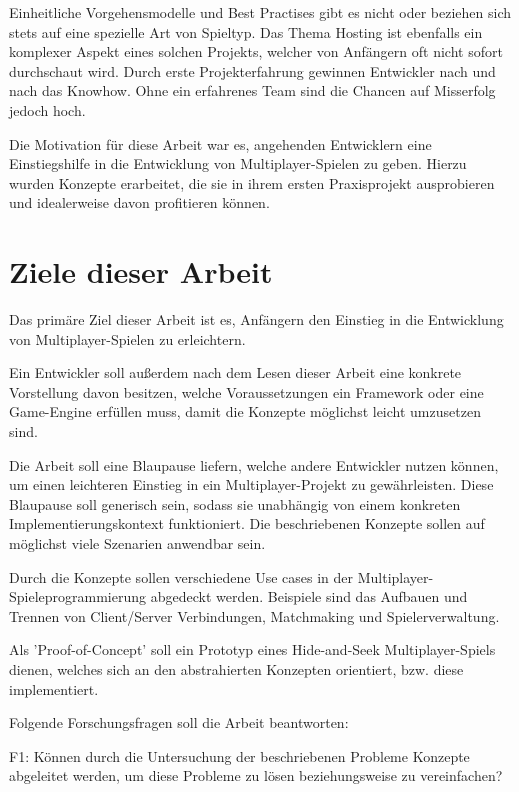 Einheitliche Vorgehensmodelle und Best Practises gibt es nicht oder beziehen sich stets auf eine spezielle Art von Spieltyp. Das Thema Hosting ist ebenfalls ein komplexer Aspekt eines solchen Projekts, welcher von Anfängern oft nicht sofort durchschaut wird. Durch erste Projekterfahrung gewinnen Entwickler nach und nach das Knowhow. Ohne ein erfahrenes Team sind die Chancen auf Misserfolg jedoch hoch. \cite{Payne.18.09.2019}

Die Motivation für diese Arbeit war es, angehenden Entwicklern eine Einstiegshilfe in die Entwicklung von Multiplayer-Spielen zu geben. Hierzu wurden Konzepte erarbeitet, die sie in ihrem ersten Praxisprojekt ausprobieren und idealerweise davon profitieren können.

\section{Ziele dieser Arbeit}

Das primäre Ziel dieser Arbeit ist es, Anfängern den Einstieg in die Entwicklung von Multiplayer-Spielen zu erleichtern.

Ein Entwickler soll außerdem nach dem Lesen dieser Arbeit eine konkrete Vorstellung davon besitzen, welche Voraussetzungen ein Framework oder eine Game-Engine erfüllen muss, damit die Konzepte möglichst leicht umzusetzen sind.

Die Arbeit soll eine Blaupause liefern, welche andere Entwickler nutzen können, um einen leichteren Einstieg in ein Multiplayer-Projekt zu gewährleisten. Diese Blaupause soll generisch sein, sodass sie unabhängig von einem konkreten Implementierungskontext funktioniert. Die beschriebenen Konzepte sollen auf möglichst viele Szenarien anwendbar sein.

Durch die Konzepte sollen verschiedene Use cases in der Multiplayer-Spieleprogrammierung abgedeckt werden. Beispiele sind das Aufbauen und Trennen von Client/Server Verbindungen, Matchmaking \cite{Wikipedia.2021b} und Spielerverwaltung.

Als 'Proof-of-Concept' soll ein Prototyp eines Hide-and-Seek Multiplayer-Spiels dienen, welches sich an den abstrahierten Konzepten orientiert, bzw. diese implementiert.

Folgende Forschungsfragen soll die Arbeit beantworten:

\label{f1} \textsf{\Large F1:} Können durch die Untersuchung der beschriebenen Probleme Konzepte abgeleitet werden, um diese Probleme zu lösen beziehungsweise zu vereinfachen?

